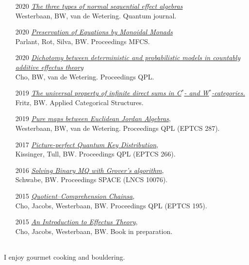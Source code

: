 \documentclass{article}
\newcommand\partitle[1]{\vskip20pt\par\noindent{\textsf{\textbf{#1}}}}
\begin{document}
\partitle{Other publications}
\begin{itemize}
    \item[2020] \emph{\href{https://quantum-journal.org/papers/q-2020-12-24-378/}{The three types of normal
            sequential effect algebras}}\\{\footnotesize
            Westerbaan, BW, van de Wetering. Quantum journal.}
    \item[2020] \emph{\href{https://drops.dagstuhl.de/opus/volltexte/2020/12746/}{Preservation of Equations by Monoidal Monads}}\\{\footnotesize
        Parlant, Rot, Silva, BW. Proceedings MFCS.}
    \item[2020] \emph{\href{https://arxiv.org/abs/2003.10245}{Dichotomy between deterministic and probabilistic models in countably additive effectus theory}}\\{\footnotesize
        Cho, BW, van de Wetering. Proceedings QPL.}
    \item[2019] \emph{\href{https://link.springer.com/article/10.1007/s10485-019-09583-9}{The
        universal property of infinite direct sums in C$^*$- and
        W$^*$-categories.}}\\{\footnotesize
        Fritz, BW. Applied Categorical Structures.}
    \item[2019] \emph{\href{https://arxiv.org/abs/1805.11496}{Pure maps between Euclidean Jordan Algebras}}, \\{\footnotesize
        Westerbaan, BW, van de Wetering.  Proceedings QPL (EPTCS 287).}
    \item[2017] \emph{\href{https://arxiv.org/abs/1704.08668}{Picture-perfect Quantum Key Distribution}}, \\{\footnotesize
        Kissinger, Tull, BW.  Proceedings QPL (EPTCS 266).}
        \item[2016] \emph{\href{https://link.springer.com/chapter/10.1007/978-3-319-49445-6_17}{Solving Binary MQ with Grover's algorithm}}, \\{\footnotesize
            Schwabe, BW. Proceedings SPACE (LNCS 10076).}
    \item[2015] \emph{\href{http://eptcs.web.cse.unsw.edu.au/paper.cgi?QPL2015.10}{Quotient--Comprehension Chainsa}}, \\{\footnotesize
        Cho, Jacobs, Westerbaan, BW. Proceedings QPL (EPTCS 195).}
    \item[2015] \emph{\href{http://arxiv.org/abs/1512.05813}{An Introduction to Effectus Theory}}, \\{\footnotesize Cho, Jacobs, Westerbaan, BW. Book in preparation.}
\end{itemize}

\partitle{Personal}\\
I enjoy gourmet cooking and bouldering.
\end{document}
